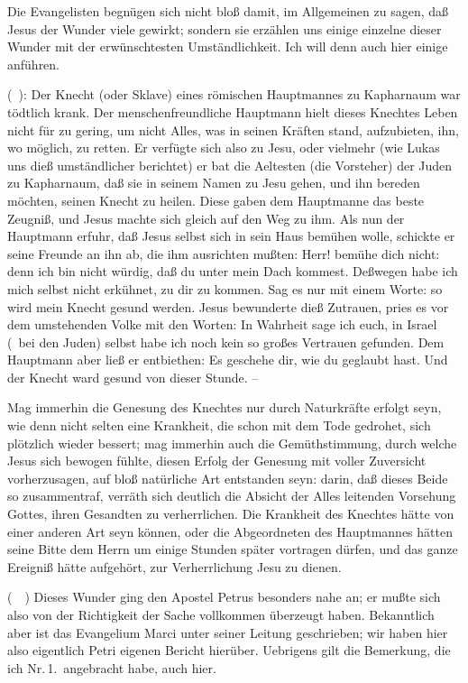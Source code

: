 Die Evangelisten begnügen sich nicht bloß damit, im Allgemeinen zu sagen, daß Jesus der Wunder viele gewirkt; sondern sie erzählen uns einige einzelne dieser Wunder mit der erwünschtesten Umständlichkeit. Ich will denn auch hier einige anführen.~
\begin{aufza}
\item {} (\ ): Der Knecht (oder Sklave) eines römischen Hauptmannes zu Kapharnaum war tödtlich krank. Der menschenfreundliche Hauptmann hielt dieses Knechtes Leben nicht für zu gering, um nicht Alles, was in seinen Kräften stand, aufzubieten, ihn, wo möglich, zu retten. Er verfügte sich also zu Jesu, oder vielmehr (wie Lukas uns dieß umständlicher berichtet) er bat die Aeltesten (die Vorsteher) der Juden zu Kapharnaum, daß sie in seinem Namen zu Jesu gehen, und ihn bereden möchten, seinen Knecht zu heilen. Diese gaben dem Hauptmanne das beste Zeugniß, und Jesus machte sich gleich auf den Weg zu ihm. Als nun der Hauptmann erfuhr, daß Jesus selbst sich in sein Haus bemühen wolle, schickte er seine Freunde an ihn ab, die ihm ausrichten mußten: Herr! bemühe dich nicht: denn ich bin nicht würdig, daß du unter mein Dach kommest. Deßwegen habe ich mich selbst nicht erkühnet, zu dir zu kommen. Sag es nur mit einem Worte: so wird mein Knecht gesund werden. Jesus bewunderte dieß Zutrauen, pries es vor dem umstehenden Volke mit den Worten: In Wahrheit sage ich euch, in Israel (\di\ bei den Juden) selbst habe ich noch kein so großes Vertrauen gefunden. Dem Hauptmann aber ließ er entbiethen: Es geschehe dir, wie du geglaubt hast. Und der Knecht ward gesund von dieser Stunde. --\par
Mag immerhin die Genesung des Knechtes nur durch Naturkräfte erfolgt seyn, wie denn nicht selten eine Krankheit, die schon mit dem Tode gedrohet, sich plötzlich wieder bessert; mag immerhin auch die Gemüthstimmung, durch welche Jesus sich bewogen fühlte, diesen Erfolg der Genesung mit voller Zuversicht vorherzusagen, auf bloß natürliche Art entstanden seyn: darin, daß dieses Beide so zusammentraf, verräth sich deutlich die Absicht der Alles leitenden Vorsehung Gottes, ihren Gesandten zu verherrlichen. Die Krankheit des Knechtes hätte von einer anderen Art seyn können, oder die Abgeordneten des Hauptmannes hätten seine Bitte dem Herrn um einige Stunden später vortragen dürfen, und das ganze Ereigniß hätte aufgehört, zur Verherrlichung Jesu zu dienen.~
\item {} (\ \ ) Dieses Wunder ging den Apostel Petrus besonders nahe an; er mußte sich also von der Richtigkeit der Sache vollkommen überzeugt haben. Bekanntlich aber ist das Evangelium Marci unter seiner Leitung geschrieben; wir haben hier also eigentlich Petri eigenen Bericht hierüber. Uebrigens gilt die Bemerkung, die ich Nr.\,1.\ angebracht habe, auch hier.

\end{aufza}
